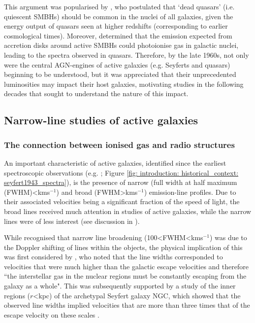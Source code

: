 This argument was popularised by \citet{LyndenBell1969}, who postulated that `dead quasars' (i.e. quiescent SMBHs) should be common in the nuclei of all galaxies, given the energy output of quasars seen at higher redshifts (corresponding to earlier cosmological times). Moreover, \citet{LyndenBell1969} determined that the emission expected from accretion disks around active SMBHs could photoionise gas in galactic nuclei, leading to the spectra observed in quasars. Therefore, by the late 1960s, not only were the central AGN-engines of active galaxies (e.g. Seyferts and quasars) beginning to be understood, but it was appreciated that their unprecedented luminosities may impact their host galaxies, motivating studies in the following decades that sought to understand the nature of this impact.

\subsection{Narrow-line studies of active galaxies}
\label{section: introduction: historical_context: nlr_studies}

\subsubsection{The connection between ionised gas and radio structures}
\label{section: introduction: historical_context: nlr_studies: early_outflows}

An important characteristic of active galaxies, identified since the earliest spectroscopic observations (e.g. \citealt{Slipher1917, Campbell1918, Seyfert1943}; Figure \ref{fig: introduction: historical_context: seyfert1943_spectra}), is the presence of narrow (full width at half maximum (FWHM)\;\textless{}\;km\;s$^{-1}$) and broad (FWHM\;\textgreater{}\;km\;s$^{-1}$) emission-line profiles. Due to their associated velocities being a significant fraction of the speed of light, the broad lines received much attention in studies of active galaxies, while the narrow lines were of less interest (see discussion in \citealt{Krolik1984}). 

While \citet{Seyfert1943} recognised that narrow line broadening (100\;\textless\;FWHM\;\textless{}\newline km\;s$^{-1}$) was due to the Doppler shifting of lines within the objects, the physical implication of this was first considered by \citet{Burbidge1958}, who noted that the line widths corresponded to velocities that were much higher than the galactic escape velocities and therefore ``the interstellar gas in the nuclear regions must be constantly escaping from the galaxy as a whole". This was subsequently supported by a study of the inner regions ($r$\;\textless{}\;kpc) of the archetypal Seyfert galaxy NGC, which showed that the observed line widths implied velocities that are more than three times that of the escape velocity on these scales \citep{Burbidge1959}. 

